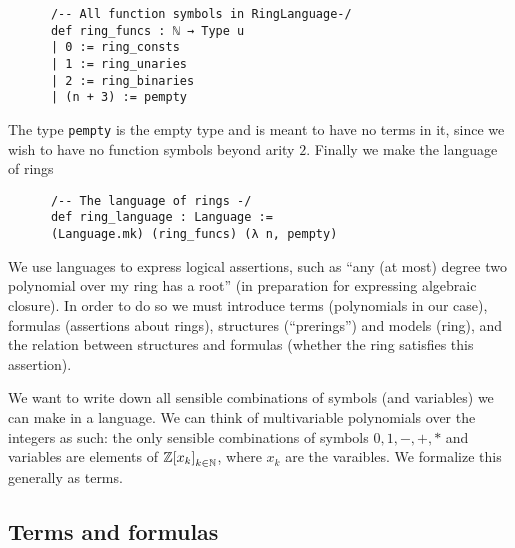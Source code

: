 \begin{dfn}
    \begin{lstlisting}
      /-- All function symbols in RingLanguage-/
      def ring_funcs : ℕ → Type u
      | 0 := ring_consts
      | 1 := ring_unaries
      | 2 := ring_binaries
      | (n + 3) := pempty\end{lstlisting}

    The type \texttt{pempty} is the empty type and is meant to have no terms in it,
    since we wish to have no function symbols beyond arity $2$.
    Finally we make the language of rings

    \begin{lstlisting}
      /-- The language of rings -/
      def ring_language : Language :=
      (Language.mk) (ring_funcs) (λ n, pempty)\end{lstlisting}
\end{dfn}

We use languages to express logical assertions, such as
``any (at most) degree two polynomial over my ring has a root''
(in preparation for expressing algebraic closure).
In order to do so we must introduce terms (polynomials in our case),
formulas (assertions about rings), structures (``prerings'') and models (ring),
and the relation between structures and formulas
(whether the ring satisfies this assertion).

We want to write down all sensible combinations of symbols (and variables)
we can make in a language.
We can think of multivariable polynomials over the integers as such:
the only sensible combinations of symbols $0,1,-,+,*$ and variables
are elements of $\mathbb{Z}{[x_{k}]}_{k \in \mathbb{N}}$,
where $x_{k}$ are the varaibles. We formalize this generally as terms.

\subsection{Terms and formulas}

